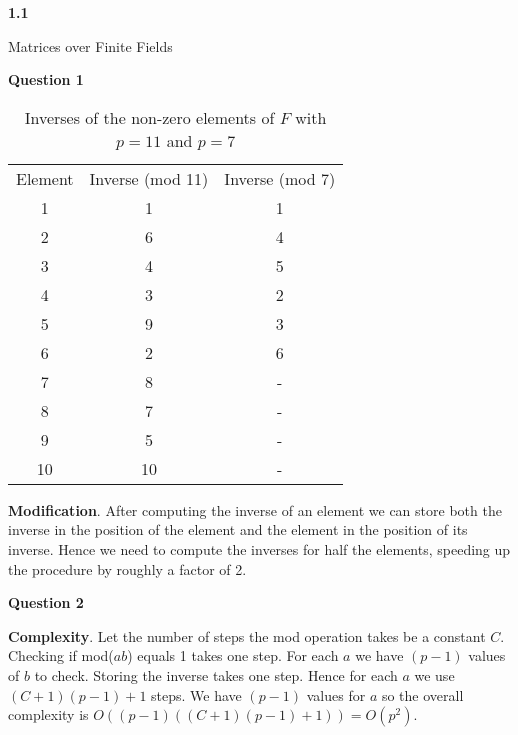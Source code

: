 \documentclass[14pt]{extarticle}
\begin{document}
\begin{flushleft}
\begin{LARGE}
\textbf{1.1}
\end{LARGE}
\end{flushleft}

\vfill
\begin{center}
\begin{Huge}Matrices over Finite Fields\end{Huge}
\end{center}
\vfill

\pagebreak

\begin{center}
\textbf{Question 1}
\end{center}
\vspace{-5mm}

\begin{table}[htp!]
\centering
\caption{Inverses of the non-zero elements of $F$ with $p = 11$ and $p=7$}
\begin{tabular}{ccc}
\\
Element & Inverse (mod 11) & Inverse (mod 7)\\ [0.5ex]
 1 &  1  &  1\\ 
 2 &  6  &  4\\ 
 3 &  4  &  5\\ 
 4 &  3  &  2\\ 
 5 &  9  &  3\\ 
 6 &  2  &  6\\ 
 7 &  8  &  -\\ 
 8 &  7  &  -\\ 
 9 &  5  &  -\\ 
10 & 10  &  -\\ 
\end{tabular}
\label{table:1}
\end{table}

\textbf{Modification}. After computing the inverse of an element we can store both the inverse in the position of the element and the element in the position of its inverse. Hence we need to compute the inverses for half the elements, speeding up the procedure by roughly a factor of 2.

\begin{center}
\textbf{Question 2}
\end{center}

\textbf{Complexity}. Let the number of steps the mod operation takes be a constant $C$. Checking if mod($ab$) equals 1 takes one step. For each $a$ we have $(p-1)$ values of $b$ to check. Storing the inverse takes one step. Hence for each $a$ we use $(C+1)(p-1)+1$ steps. We have $(p-1)$ values for $a$ so the overall complexity is $O((p-1)((C+1)(p-1)+1)) = O(p^2)$.
\end{document}
